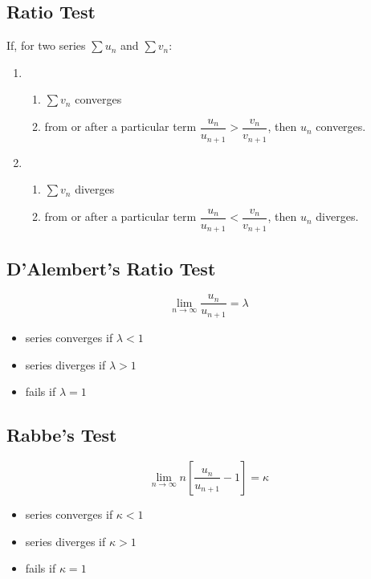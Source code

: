 \documentclass[openany, oneside]{book}
\begin{document}
\subsection{Ratio Test}
If, for two series $\sum u_n$ and $\sum v_n$:

\begin{enumerate}
\item \begin{enumerate}
\item $\sum v_n$ converges
\item from or after a particular term $\dfrac{u_n}{u_{n+1}}>\dfrac{v_n}{v_{n+1}}$, then $u_n$ converges.
\end{enumerate}
\item \begin{enumerate}
\item $\sum v_n$ diverges
\item from or after a particular term $\dfrac{u_n}{u_{n+1}}<\dfrac{v_n}{v_{n+1}}$, then $u_n$ diverges.
\end{enumerate}
\end{enumerate}

\subsection{D'Alembert's Ratio Test}
\begin{equation}
\lim_{n\to\infty} \dfrac{u_n}{u_{n+1}}=\lambda
\end{equation}
\begin{itemize}
\item series converges if $\lambda<1$
\item series diverges if $\lambda>1$
\item fails if $\lambda=1$
\end{itemize}

\subsection{Rabbe's Test}
\begin{equation}
\lim_{n\to\infty} n[\dfrac{u_n}{u_{n+1}}-1]=\kappa
\end{equation}
\begin{itemize}
\item series converges if $\kappa<1$
\item series diverges if $\kappa>1$
\item fails if $\kappa=1$
\end{itemize}
\end{document}
